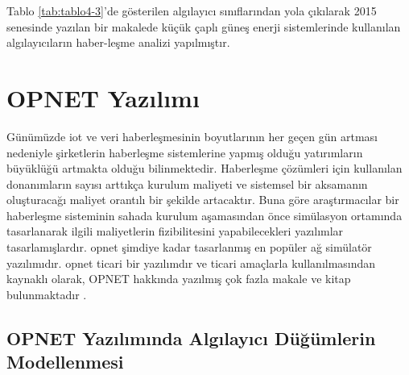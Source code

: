 Tablo \ref{tab:tablo4-3}’de gösterilen algılayıcı sınıflarından yola çıkılarak 2015 senesinde yazılan bir makalede küçük çaplı güneş enerji sistemlerinde kullanılan algılayıcıların haber-leşme analizi yapılmıştır. \cite{ahmed2015communication}

\section{OPNET Yazılımı}

Günümüzde \gls{iot} ve veri haberleşmesinin boyutlarının her geçen gün artması nedeniyle şirketlerin haberleşme sistemlerine yapmış olduğu yatırımların büyüklüğü artmakta olduğu bilinmektedir. Haberleşme çözümleri için kullanılan donanımların sayısı arttıkça kurulum maliyeti ve sistemsel bir aksamanın oluşturacağı maliyet orantılı bir şekilde artacaktır. Buna göre araştırmacılar bir haberleşme sisteminin sahada kurulum aşamasından önce simülasyon ortamında tasarlanarak ilgili maliyetlerin fizibilitesini yapabilecekleri yazılımlar tasarlamışlardır. \gls{opnet} şimdiye kadar tasarlanmış en popüler ağ simülatör yazılımıdır. \gls{opnet} ticari bir yazılımdır ve ticari amaçlarla kullanılmasından kaynaklı olarak, OPNET hakkında yazılmış çok fazla makale ve kitap bulunmaktadır \cite{lu2012unlocking}\cite{sethi2012practical}. 

\subsection{OPNET Yazılımında Algılayıcı Düğümlerin Modellenmesi}

